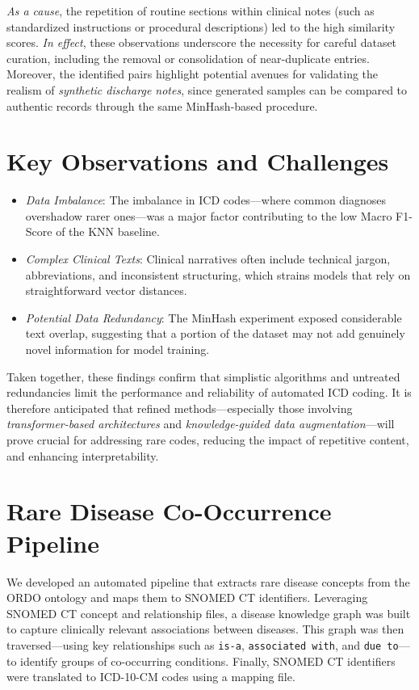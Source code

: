 \emph{As a cause}, the repetition of routine sections within clinical notes (such as standardized instructions or procedural descriptions) led to the high similarity scores. \emph{In effect}, these observations underscore the necessity for careful dataset curation, including the removal or consolidation of near-duplicate entries. Moreover, the identified pairs highlight potential avenues for validating the realism of \emph{synthetic discharge notes}, since generated samples can be compared to authentic records through the same MinHash-based procedure.

\section{Key Observations and Challenges}
\begin{itemize}
    \item \emph{Data Imbalance}:
    The imbalance in ICD codes—where common diagnoses overshadow rarer ones—was a major factor contributing to the low Macro F1-Score of the KNN baseline.
    \item \emph{Complex Clinical Texts}:
    Clinical narratives often include technical jargon, abbreviations, and inconsistent structuring, which strains models that rely on straightforward vector distances.
    \item \emph{Potential Data Redundancy}:
    The MinHash experiment exposed considerable text overlap, suggesting that a portion of the dataset may not add genuinely novel information for model training.
\end{itemize}

Taken together, these findings confirm that simplistic algorithms and untreated redundancies limit the performance and reliability of automated ICD coding. It is therefore anticipated that refined methods—especially those involving \emph{transformer-based architectures} and \emph{knowledge-guided data augmentation}—will prove crucial for addressing rare codes, reducing the impact of repetitive content, and enhancing interpretability.

\section{Rare Disease Co-Occurrence Pipeline}

We developed an automated pipeline that extracts rare disease concepts from the ORDO ontology and maps them to SNOMED CT identifiers. Leveraging SNOMED CT concept and relationship files, a disease knowledge graph was built to capture clinically relevant associations between diseases. This graph was then traversed—using key relationships such as \texttt{is-a}, \texttt{associated with}, and \texttt{due to}—to identify groups of co-occurring conditions. Finally, SNOMED CT identifiers were translated to ICD-10-CM codes using a mapping file.


